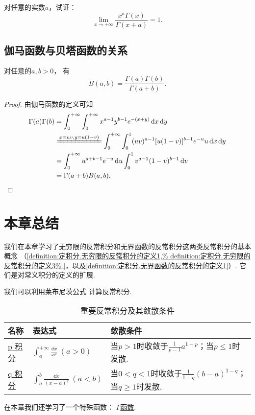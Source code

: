 \begin{example}
对任意的实数\(a\)，试证：\[
	\lim_{x\to+\infty} \frac{x^a \Gamma(x)}{\Gamma(x+a)} = 1.
\]
\end{example}

\subsection{伽马函数与贝塔函数的关系}
\begin{theorem}
对任意的\(a,b>0\)，
有\begin{equation}\label{equation:定积分.伽马函数与贝塔函数的关系}
	B(a,b) = \frac{\Gamma(a) \Gamma(b)}{\Gamma(a+b)}.
\end{equation}
\begin{proof}
由伽马函数的定义可知\begin{align*}
	\Gamma(a) \Gamma(b)
	&= \int_0^{+\infty} \int_0^{+\infty} x^{a-1} y^{b-1} e^{-(x+y)} \dd{x}\dd{y} \\
	&\xlongequal{x=uv,y=u(1-v)}
	\int_0^{+\infty} \int_0^1 (uv)^{a-1} [u(1-v)]^{b-1} e^{-u} u \dd{x}\dd{y} \\
	&=\int_0^{+\infty} u^{a+b-1} e^{-u} \dd{u}
		\int_0^1 v^{a-1} (1-v)^{b-1} \dd{v} \\
	&= \Gamma(a+b) B(a,b).
	\qedhere
\end{align*}
\end{proof}
\end{theorem}

\section{本章总结}

我们在本章学习了无穷限的反常积分和无界函数的反常积分这两类反常积分的基本概念%
（\cref{definition:定积分.无穷限的反常积分的定义1,%
definition:定积分.无穷限的反常积分的定义3%
}，以及\cref{definition:定积分.无界函数的反常积分的定义1}）.
它们是对常义积分的定义的扩展.

我们可以利用莱布尼茨公式
计算反常积分.

\begin{table}[hb]
	\centering
	\begin{tabular}{*3l}
		\hline
		名称 & 表达式 & 敛散条件 \\
		\hline
		{\hyperref[example:定积分.p积分]{p 积分}}
			& \(\int_a^{+\infty} \frac{\dd{x}}{x^p}\ (a>0)\)
			& 当\(p > 1\)时收敛于\(\frac{1}{p-1} a^{1-p}\)；当\(p \leq 1\)时发散. \\[.5cm]
		{\hyperref[example:定积分.q积分]{q 积分}}
			& \(\int_a^b \frac{\dd{x}}{(x-a)^q}\ (a<b)\)
			& 当\(0 < q < 1\)时收敛于\(\frac{1}{1-q} (b-a)^{1-q}\)；当\(q \geq 1\)时发散. \\[.5cm]
		\hline
	\end{tabular}
	\caption{重要反常积分及其敛散条件}
\end{table}

在本章我们还学习了一个特殊函数：
\hyperref[equation:特殊函数.伽马函数的积分定义]{\(\Gamma\)函数}.
